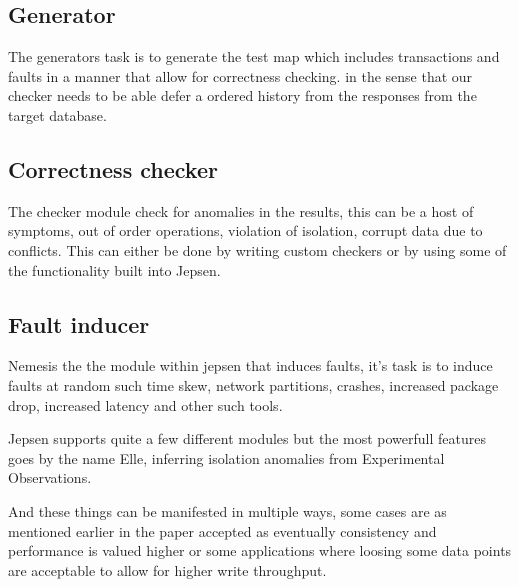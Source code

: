 \documentclass[a4paper,10pt,titlepage]{report}
\begin{document}
    \subsection{Generator}
    The generators task is to generate the test map which includes transactions and faults in a manner that allow for correctness checking. in the sense that our checker needs to be able defer a ordered history from the responses from the target database.
    
    \subsection{Correctness checker}
    The checker module check for anomalies in the results, this can be a host of symptoms, out of order operations, violation of isolation, corrupt data due to conflicts. This can either be done by writing custom checkers or by using some of the functionality built into Jepsen.
    
    \subsection{Fault inducer}
    Nemesis the the module within jepsen that induces faults, it's task is to induce faults at random such time skew, network partitions, crashes, increased package drop, increased latency and other such tools.
    
    
    

    Jepsen supports quite a few different modules but the most powerfull features goes by the name Elle, inferring isolation anomalies from Experimental Observations. \\
    \vspace{5mm}

    \vspace{5mm}

    And these things can be manifested in multiple ways, some cases are as mentioned earlier in the paper accepted as eventually consistency and performance is valued higher or some applications where loosing some data points are acceptable to allow for higher write throughput.\\
    \vspace{5mm}
\end{document}

